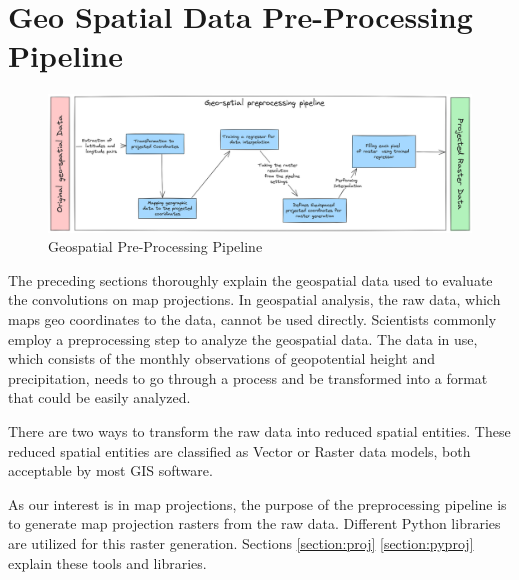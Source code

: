 
\clearpage
\cleardoublepage

\chapter{Geo Spatial Data Pre-Processing Pipeline}
\label{chap:preprocess}
\begin{figure}[h]
    \centering
    \includegraphics[width=1.0\linewidth]{figures/chapter-7/preprocessing_pipeline.png}
    \caption{Geospatial Pre-Processing Pipeline}
    \label{fig:preprocessingpipeline}
\end{figure}
The preceding sections thoroughly explain the geospatial data used to evaluate the convolutions on map projections. In geospatial analysis, the raw data, which maps geo coordinates to the data, cannot be used directly. Scientists commonly employ a preprocessing step to analyze the geospatial data. The data in use, which consists of the monthly observations of geopotential height and precipitation, needs to go through a process and be transformed into a format that could be easily analyzed.

There are two ways to transform the raw data into reduced spatial entities. These reduced spatial entities are classified as Vector or Raster data models, both acceptable by most GIS software.

As our interest is in map projections, the purpose of the preprocessing pipeline is to generate map projection rasters from the raw data. Different Python libraries are utilized for this raster generation.
Sections \autoref{section:proj} \autoref{section:pyproj} explain these tools and libraries.

